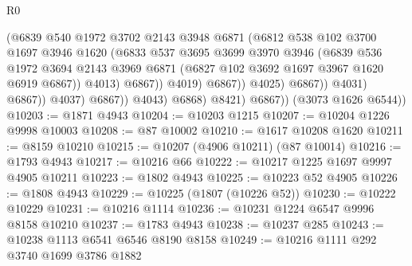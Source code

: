 \begin{lexlean}{R0}
\begin{coremodule}
                                        (@6839
                                          @540
                                          @1972
                                          @3702
                                          @2143
                                          @3948
                                          @6871
                                          (@6812
                                            @538
                                            @102
                                            @3700
                                            @1697
                                            @3946
                                            @1620
                                            (@6833
                                              @537
                                              @3695
                                              @3699
                                              @3970
                                              @3946
                                              (@6839
                                                @536
                                                @1972
                                                @3694
                                                @2143
                                                @3969
                                                @6871
                                                (@6827 @102 @3692 @1697 @3967 @1620 @6919 @6867))
                                              @4013)
                                            @6867))
                                        @4019)
                                      @6867))
                                  @4025)
                                @6867))
                            @4031)
                          @6867))
                      @4037)
                    @6867))
                @4043)
              @6868)
            @8421)
          @6867))
      (@3073 @1626 @6544))
@10203 := @1871 @4943
@10204 := @10203 @1215
@10207 := @10204 @1226 @9998 @10003
@10208 := @87 @10002
@10210 := @1617 @10208 @1620
@10211 := @8159 @10210
@10215 := @10207 (@4906 @10211) (@87 @10014)
@10216 := @1793 @4943
@10217 := @10216 @66
@10222 := @10217 @1225 @1697 @9997 @4905 @10211
@10223 := @1802 @4943
@10225 := @10223 @52 @4905
@10226 := @1808 @4943
@10229 := @10225 (@1807 (@10226 @52))
@10230 := @10222 @10229
@10231 := @10216 @1114
@10236 := @10231 @1224 @6547 @9996 @8158 @10210
@10237 := @1783 @4943
@10238 := @10237 @285
@10243 := @10238 @1113 @6541 @6546 @8190 @8158
@10249 := @10216 @1111 @292 @3740 @1699 @3786 @1882

\end{coremodule}
\end{lexlean}
